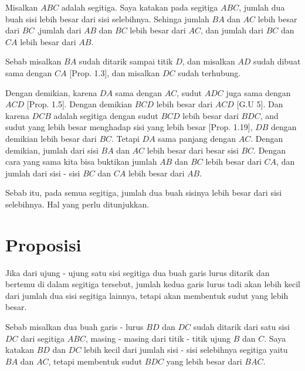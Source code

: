 \documentclass[a4paper]{book}
\begin{document}
Misalkan $ABC$ adalah segitiga. Saya katakan pada segitiga $ABC$, jumlah dua
buah sisi lebih besar dari sisi selebihnya. Sehinga jumlah $BA$ dan $AC$ lebih
besar dari $BC$ ,jumlah dari $AB$ dan $BC$ lebih besar dari $AC$, dan jumlah
dari $BC$ dan $CA$ lebih besar dari $AB$.

Sebab misalkan $BA$ sudah ditarik sampai titik $D$, dan misalkan $AD$ sudah dibuat 
sama dengan $CA$ [Prop. 1.3], dan misalkan $DC$ sudah terhubung.

Dengan demikian, karena $DA$ sama dengan $AC$, sudut $ADC$ juga sama dengan 
$ACD$ [Prop. 1.5]. Dengan demikian $BCD$ lebih besar dari $ACD$ [G.U 5]. 
Dan karena $DCB$ adalah segitiga dengan sudut $BCD$ lebih besar dari $BDC$, 
and sudut yang lebih besar menghadap sisi yang lebih besar [Prop. 1.19], $DB$
dengan demikian lebih besar dari $BC$. Tetapi $DA$ sama panjang dengan $AC$.
Dengan demikian, jumlah dari sisi $BA$ dan $AC$ lebih besar dari besar sisi
$BC$. Dengan cara yang sama kita bisa buktikan jumlah $AB$ dan $BC$ lebih besar
dari $CA$, dan jumlah dari sisi - sisi $BC$ dan $CA$ lebih besar dari $AB$.  

Sebab itu, pada semua segitiga, jumlah dua buah sisinya lebih besar dari sisi 
selebihnya. Hal yang perlu ditunjukkan.  

\section*{\centering Proposisi \thesection}
Jika dari ujung - ujung satu sisi segitiga dua buah garis lurus ditarik dan 
bertemu di dalam segitiga tersebut, jumlah kedua garis lurus tadi akan lebih
kecil dari jumlah dua sisi segitiga lainnya, tetapi akan membentuk sudut
yang lebih besar.

\begin{center}
\end{center}

Sebab misalkan dua buah garis - lurus $BD$ dan $DC$ sudah ditarik dari
satu sisi $DC$ dari segitiga $ABC$, masing - masing dari titik - titik ujung
$B$ dan $C$. Saya katakan $BD$ dan $DC$ lebih kecil dari jumlah sisi - sisi
selebihnya segitiga yaitu $BA$ dan $AC$, tetapi membentuk sudut 
$BDC$ yang lebih besar  dari $BAC$.
\end{document}
